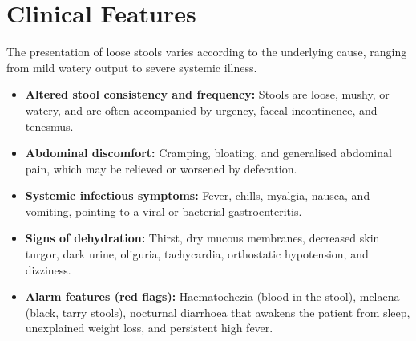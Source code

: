 \section*{Clinical Features}
The presentation of loose stools varies according to the underlying cause, ranging from mild watery output to severe systemic illness.
\begin{itemize}
    \item \textbf{Altered stool consistency and frequency:} Stools are loose, mushy, or watery, and are often accompanied by urgency, faecal incontinence, and tenesmus.
    \item \textbf{Abdominal discomfort:} Cramping, bloating, and generalised abdominal pain, which may be relieved or worsened by defecation.
    \item \textbf{Systemic infectious symptoms:} Fever, chills, myalgia, nausea, and vomiting, pointing to a viral or bacterial gastroenteritis.
    \item \textbf{Signs of dehydration:} Thirst, dry mucous membranes, decreased skin turgor, dark urine, oliguria, tachycardia, orthostatic hypotension, and dizziness.
    \item \textbf{Alarm features (red flags):} Haematochezia (blood in the stool), melaena (black, tarry stools), nocturnal diarrhoea that awakens the patient from sleep, unexplained weight loss, and persistent high fever.
\end{itemize}

